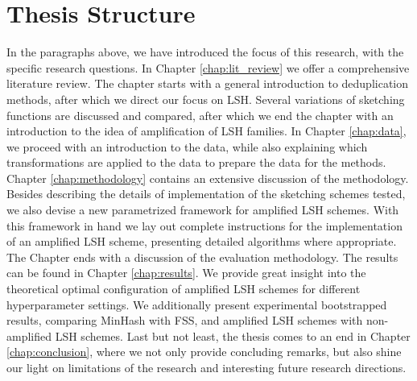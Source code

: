 \section{Thesis Structure}
\label{sect:structure}
In the paragraphs above, we have introduced the focus of this research, with the specific research questions. In Chapter \ref{chap:lit_review} we offer a comprehensive literature review. The chapter starts with a general introduction to deduplication methods, after which we direct our focus on LSH.  Several variations of sketching functions are discussed and compared, after which we end the chapter with an introduction to the idea of amplification of LSH families. In Chapter \ref{chap:data}, we proceed with an introduction to the data, while also explaining which transformations are applied to the data to prepare the data for the methods. Chapter \ref{chap:methodology} contains an extensive discussion of the methodology. Besides describing the details of implementation of the sketching schemes tested, we also devise a new parametrized framework for amplified LSH schemes. With this framework in hand we lay out complete instructions for the implementation of an amplified LSH scheme, presenting detailed algorithms where appropriate. The Chapter ends with a discussion of the evaluation methodology. The results can be found in Chapter \ref{chap:results}. We provide great insight into the theoretical optimal configuration of amplified LSH schemes for different hyperparameter settings. We additionally present experimental bootstrapped results, comparing MinHash with FSS, and amplified LSH schemes with non-amplified LSH schemes. Last but not least, the thesis comes to an end in Chapter \ref{chap:conclusion}, where we not only provide concluding remarks, but also shine our light on limitations of the research and interesting future research directions.  
